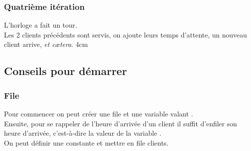 \documentclass[a4paper,12pt,french]{book}
\begin{document}
\subsubsection*{Quatrième itération}
\double
{
L'horloge a fait un tour.\\
Les 2 clients précédents sont servis, on ajoute leurs temps d'attente, un nouveau client arrive, \textit{et c\ae tera}.
}
{
}{4cm}

\subsection*{Conseils pour démarrer}

\subsubsection*{File}
Pour commencer on peut créer une file  et une variable  valant .\\
Ensuite, pour se rappeler de l'heure d'arrivée d'un client il suffit d'enfiler son heure d'arrivée, c'est-à-dire la valeur de la variable .\\
On peut définir une constante  et mettre en file  clients.\\
\end{document}
